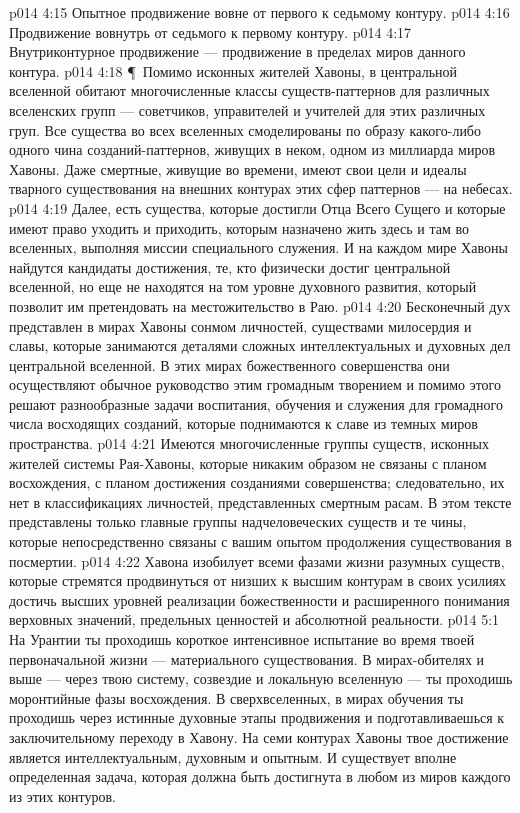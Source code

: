 \vs p014 4:15 \bibnobreakspace Опытное продвижение вовне от первого к седьмому контуру.
\vs p014 4:16 \bibnobreakspace Продвижение вовнутрь от седьмого к первому контуру.
\vs p014 4:17 \bibnobreakspace Внутриконтурное продвижение --- продвижение в пределах миров данного контура.
\vs p014 4:18 \P\ Помимо исконных жителей Хавоны, в центральной вселенной обитают многочисленные классы существ\hyp{}паттернов для различных вселенских групп --- советчиков, управителей и учителей для этих различных груп. Все существа во всех вселенных смоделированы по образу какого\hyp{}либо одного чина созданий\hyp{}паттернов, живущих в неком, одном из миллиарда миров Хавоны. Даже смертные, живущие во времени, имеют свои цели и идеалы тварного существования на внешних контурах этих сфер паттернов --- на небесах.
\vs p014 4:19 Далее, есть существа, которые достигли Отца Всего Сущего и которые имеют право уходить и приходить, которым назначено жить здесь и там во вселенных, выполняя миссии специального служения. И на каждом мире Хавоны найдутся кандидаты достижения, те, кто физически достиг центральной вселенной, но еще не находятся на том уровне духовного развития, который позволит им претендовать на местожительство в Раю.
\vs p014 4:20 Бесконечный дух представлен в мирах Хавоны сонмом личностей, существами милосердия и славы, которые занимаются деталями сложных интеллектуальных и духовных дел центральной вселенной. В этих мирах божественного совершенства они осуществляют обычное руководство этим громадным творением и помимо этого решают разнообразные задачи воспитания, обучения и служения для громадного числа восходящих созданий, которые поднимаются к славе из темных миров пространства.
\vs p014 4:21 Имеются многочисленные группы существ, исконных жителей системы Рая\hyp{}Хавоны, которые никаким образом не связаны с планом восхождения, с планом достижения созданиями совершенства; следовательно, их нет в классификациях личностей, представленных смертным расам. В этом тексте представлены только главные группы надчеловеческих существ и те чины, которые непосредственно связаны с вашим опытом продолжения существования в посмертии.
\vs p014 4:22 Хавона изобилует всеми фазами жизни разумных существ, которые стремятся продвинуться от низших к высшим контурам в своих усилиях достичь высших уровней реализации божественности и расширенного понимания верховных значений, предельных ценностей и абсолютной реальности.
\vs p014 5:1 На Урантии ты проходишь короткое интенсивное испытание во время твоей первоначальной жизни --- материального существования. В мирах\hyp{}обителях и выше --- через твою систему, созвездие и локальную вселенную --- ты проходишь моронтийные фазы восхождения. В сверхвселенных, в мирах обучения ты проходишь через истинные духовные этапы продвижения и подготавливаешься к заключительному переходу в Хавону. На семи контурах Хавоны твое достижение является интеллектуальным, духовным и опытным. И существует вполне определенная задача, которая должна быть достигнута в любом из миров каждого из этих контуров.
